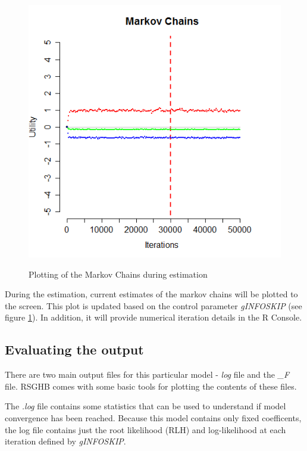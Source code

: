 \documentclass{article}\usepackage{graphicx, color}
\begin{document}
\begin{figure}
\caption{Plotting of the Markov Chains during estimation}
\includegraphics[scale=0.50]{MNL_markovChains.png}
\label{MarkovChain}
\end{figure}

During the estimation, current estimates of the markov chains will be plotted to the screen. This plot is updated based on the control parameter \emph{gINFOSKIP} (see figure \ref{MarkovChain}). In addition, it will provide numerical iteration details in the R Console.



\subsection*{Evaluating the output}

There are two main output files for this particular model - \emph{log} file and the \emph{\_F} file. RSGHB comes with some basic tools for plotting the contents of these files.

The \emph{.log} file contains some statistics that can be used to understand if model convergence has been reached. Because this model contains only fixed coefficents, the log file contains just the root likelihood (RLH) and log-likelihood at each iteration defined by \emph{gINFOSKIP}.
\end{document}
